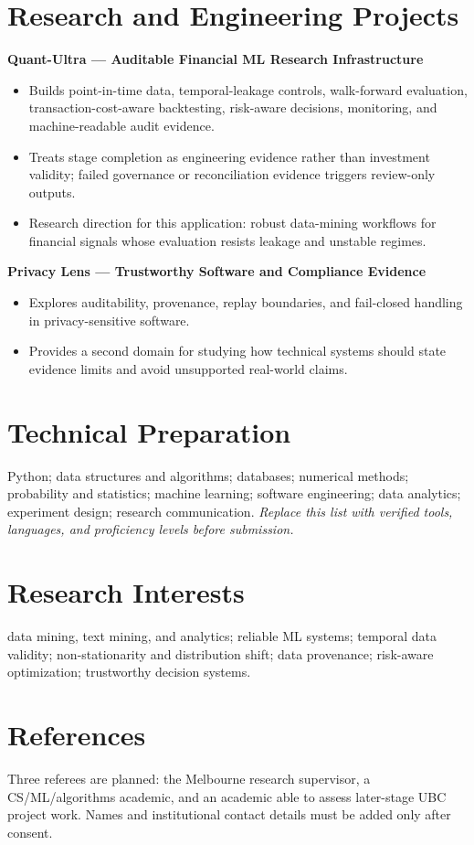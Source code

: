 \documentclass[11pt]{article}
\begin{document}
\section*{Research and Engineering Projects}
\textbf{Quant-Ultra --- Auditable Financial ML Research Infrastructure}
\begin{itemize}
\item Builds point-in-time data, temporal-leakage controls, walk-forward evaluation, transaction-cost-aware backtesting, risk-aware decisions, monitoring, and machine-readable audit evidence.
\item Treats stage completion as engineering evidence rather than investment validity; failed governance or reconciliation evidence triggers review-only outputs.
\item Research direction for this application: robust data-mining workflows for financial signals whose evaluation resists leakage and unstable regimes.
\end{itemize}

\begin{samepage}
\textbf{Privacy Lens --- Trustworthy Software and Compliance Evidence}
\begin{itemize}
\item Explores auditability, provenance, replay boundaries, and fail-closed handling in privacy-sensitive software.
\item Provides a second domain for studying how technical systems should state evidence limits and avoid unsupported real-world claims.
\end{itemize}
\end{samepage}

\section*{Technical Preparation}
Python; data structures and algorithms; databases; numerical methods; probability and statistics; machine learning; software engineering; data analytics; experiment design; research communication. \textit{Replace this list with verified tools, languages, and proficiency levels before submission.}

\section*{Research Interests}
data mining, text mining, and analytics; reliable ML systems; temporal data validity; non-stationarity and distribution shift; data provenance; risk-aware optimization; trustworthy decision systems.

\section*{References}
Three referees are planned: the Melbourne research supervisor, a CS/ML/algorithms academic, and an academic able to assess later-stage UBC project work. Names and institutional contact details must be added only after consent.
\end{document}
